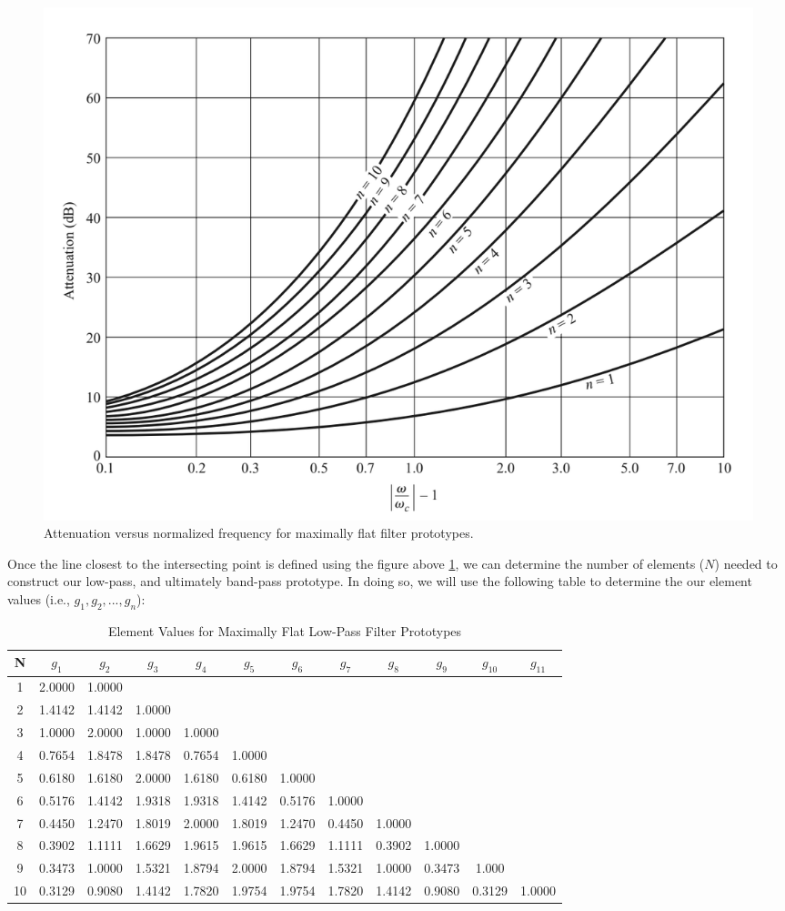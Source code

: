 \documentclass{article}
\begin{document}
\begin{figure}[h!]
    \centering
    \includegraphics[scale=0.5]{images/butterworth_attenuation_table.png}
    \caption{Attenuation versus normalized frequency for maximally flat filter prototypes.}
    \label{fig:1}
\end{figure}
Once the line closest to the intersecting point is defined using the figure above \ref{fig:1}, we can determine the number of elements ($N$) needed to construct our low-pass, and ultimately band-pass prototype. In doing so, we will use the following table to determine the our element values (i.e., $g_1, g_2,...,g_n$):
\begin{table}[h!]
\centering
\begin{tabular}{| c | c | c | c | c | c | c | c | c | c | c | c |} 
 \hline
 N & $g_1$ & $g_2$ & $g_3$ & $g_4$ & $g_5$ & $g_6$ & $g_7$ & $g_8$ & $g_9$ & $g_{10}$ & $g_{11}$ \\ [0.5ex] 
 \hline
 1 & 2.0000 & 1.0000 & & & & & & & & & \\ 
 \hline
 2 & 1.4142 & 1.4142 & 1.0000 & & & & & & & & \\
 \hline
 3 & 1.0000 & 2.0000 & 1.0000 & 1.0000 & & & & & & & \\
 \hline
 4 & 0.7654 & 1.8478 & 1.8478 & 0.7654 & 1.0000 & & & & & & \\
 \hline
 5 & 0.6180 & 1.6180 & 2.0000 & 1.6180 & 0.6180 & 1.0000 & & & & & \\
 \hline
 6 & 0.5176 & 1.4142 & 1.9318 & 1.9318 & 1.4142 & 0.5176 & 1.0000 & & & & \\
 \hline
 7 & 0.4450 & 1.2470 & 1.8019 & 2.0000 & 1.8019 & 1.2470 & 0.4450 & 1.0000 & & & \\
 \hline
 8 & 0.3902 & 1.1111 & 1.6629 & 1.9615 & 1.9615 & 1.6629 & 1.1111 & 0.3902 & 1.0000 & & \\
 \hline
 9 & 0.3473 & 1.0000 & 1.5321 & 1.8794 & 2.0000 & 1.8794 & 1.5321 & 1.0000 & 0.3473 & 1.000 & \\
 \hline
 10 & 0.3129 & 0.9080 & 1.4142 & 1.7820 & 1.9754 & 1.9754 & 1.7820 & 1.4142 & 0.9080 & 0.3129 & 1.0000 \\
 \hline
\end{tabular}
\caption{Element Values for Maximally Flat Low-Pass Filter Prototypes}
\label{table:2}
\end{table}
\end{document}
